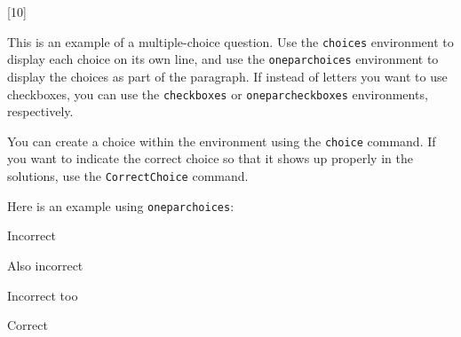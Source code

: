 [10]

This is an example of a multiple-choice question. Use the \texttt{choices}
environment to display each choice on its own line, and use the
\texttt{oneparchoices} environment to display the choices as part of the
paragraph. If instead of letters you want to use checkboxes, you can use the
\texttt{checkboxes} or \texttt{oneparcheckboxes} environments, respectively.

You can create a choice within the environment using the \texttt{choice}
command. If you want to indicate the correct choice so that it shows up properly
in the solutions, use the \texttt{CorrectChoice} command.

Here is an example using \texttt{oneparchoices}:

\begin{oneparchoices}

  \choice Incorrect

  \choice Also incorrect

  \choice Incorrect too

  \CorrectChoice Correct

\end{oneparchoices}
